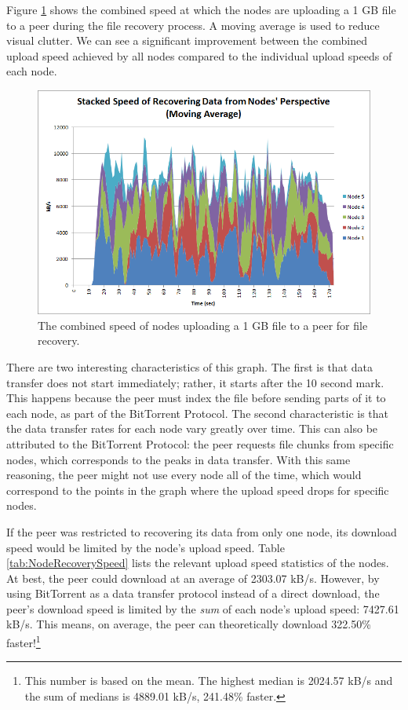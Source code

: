 \documentclass[12pt]{report}
\begin{document}
Figure \ref{fig:NodeRecoverySpeed} shows the combined speed at which the nodes are uploading a 1 GB file to a peer during the file recovery process. A moving average is used to reduce visual clutter. We can see a significant improvement between the combined upload speed achieved by all nodes compared to the individual upload speeds of each node.

\begin{figure}
  \centerline{\includegraphics[scale=1]{figures/NodeRecoverySpeed}}
  \caption{The combined speed of nodes uploading a 1 GB file to a peer for file recovery.
  \label{fig:NodeRecoverySpeed}}
\end{figure}

There are two interesting characteristics of this graph. The first is that data transfer does not start immediately; rather, it starts after the 10 second mark. This happens because the peer must index the file before sending parts of it to each node, as part of the BitTorrent Protocol. The second characteristic is that the data transfer rates for each node vary greatly over time. This can also be attributed to the BitTorrent Protocol: the peer requests file chunks from specific nodes, which corresponds to the peaks in data transfer. With this same reasoning, the peer might not use every node all of the time, which would correspond to the points in the graph where the upload speed drops for specific nodes.

If the peer was restricted to recovering its data from only one node, its download speed would be limited by the node's upload speed. Table \ref{tab:NodeRecoverySpeed} lists the relevant upload speed statistics of the nodes. At best, the peer could download at an average of 2303.07 kB/s. However, by using BitTorrent as a data transfer protocol instead of a direct download, the peer's download speed is limited by the \textit{sum} of each node's upload speed: 7427.61 kB/s. This means, on average, the peer can theoretically download 322.50\% faster!\footnote{This number is based on the mean. The highest median is 2024.57 kB/s and the sum of medians is 4889.01 kB/s, 241.48\% faster.}
\end{document}
